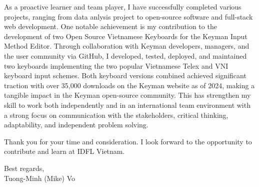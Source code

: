 \documentclass[a4paper,11pt]{article}
\newcommand{\p}[1]{#1\\\vspace{6pt}}
\begin{document}
\p{As a proactive learner and team player, I have successfully completed various projects, ranging from data anlysis project to open-source software and full-stack web development. One notable achievement is my contribution to the development of two Open Source Vietnamese Keyboards for the Keyman Input Method Editor. Through collaboration with Keyman developers, managers, and the user community via GitHub, I developed, tested, deployed, and maintained two keyboards implementing the two popular Vietnamese Telex and VNI keyboard input schemes. Both keyboard versions combined achieved significant traction with over 35,000 downloads on the Keyman website as of 2024, making a tangible impact in the Keyman open-source community. This has strengthen my skill to work both independently and in an international team environment with a strong focus on communication with the stakeholders, critical thinking, adaptability, and independent problem solving.}

\p{Thank you for your time and consideration. I look forward to the opportunity to contribute and learn at IDFL Vietnam.}

\p{Best regards,\\
Tuong-Minh (Mike) Vo}
%
\end{document}
